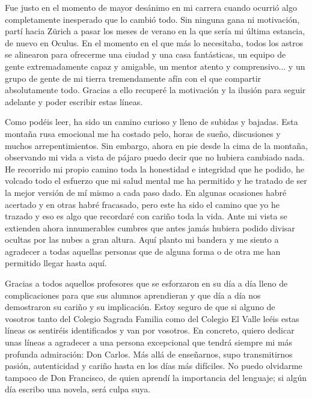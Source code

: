 \newpage

Fue justo en el momento de mayor desánimo en mi carrera cuando ocurrió algo completamente inesperado que lo cambió todo. Sin ninguna gana ni motivación, partí hacia Zürich a pasar los meses de verano en la que sería mi última estancia, de nuevo en Oculus. En el momento en el que más lo necesitaba, todos los astros se alinearon para ofrecerme una ciudad y una casa fantásticas, un equipo de gente extremadamente capaz y amigable, un mentor atento y comprensivo... y un grupo de gente de mi tierra tremendamente afín con el que compartir absolutamente todo. Gracias a ello recuperé la motivación y la ilusión para seguir adelante y poder escribir estas líneas.

Como podéis leer, ha sido un camino curioso y lleno de subidas y bajadas. Esta montaña rusa emocional me ha costado pelo, horas de sueño, discusiones y muchos arrepentimientos. Sin embargo, ahora en pie desde la cima de la montaña, observando mi vida a vista de pájaro puedo decir que no hubiera cambiado nada. He recorrido mi propio camino toda la honestidad e integridad que he podido, he volcado todo el esfuerzo que mi salud mental me ha permitido y he tratado de ser la mejor versión de mí mismo a cada paso dado. En algunas ocasiones habré acertado y en otras habré fracasado, pero este ha sido el camino que yo he trazado y eso es algo que recordaré con cariño toda la vida.
Ante mi vista se extienden ahora innumerables cumbres que antes jamás hubiera podido divisar ocultas por las nubes a gran altura. Aquí planto mi bandera y me siento a agradecer a todas aquellas personas que de alguna forma o de otra me han permitido llegar hasta aquí.

Gracias a todos aquellos profesores que se esforzaron en su día a día lleno de complicaciones para que sus alumnos aprendieran y que día a día nos demostraron su cariño y su implicación. Estoy seguro de que si alguno de vosotros tanto del Colegio Sagrada Familia como del Colegio El Valle leéis estas líneas os sentiréis identificados y van por vosotros. En concreto, quiero dedicar unas líneas a agradecer a una persona excepcional que tendrá siempre mi más profunda admiración: Don Carlos. Más allá de enseñarnos, supo transmitirnos pasión, autenticidad y cariño hasta en los días más difíciles. No puedo olvidarme tampoco de Don Francisco, de quien aprendí la importancia del lenguaje; si algún día escribo una novela, será culpa suya.

